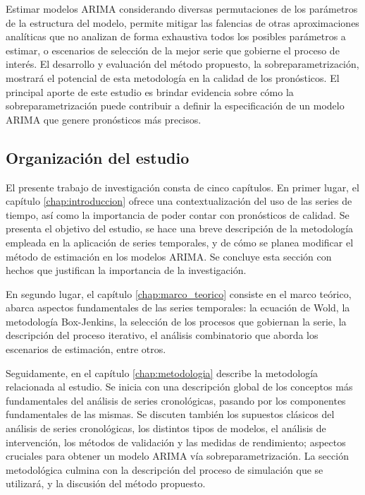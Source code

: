 \documentclass[
]{article}
\begin{document}
Estimar modelos ARIMA considerando diversas permutaciones de los
parámetros de la estructura del modelo, permite mitigar las falencias de
otras aproximaciones analíticas que no analizan de forma exhaustiva
todos los posibles parámetros a estimar, o escenarios de selección de la
mejor serie que gobierne el proceso de interés. El desarrollo y
evaluación del método propuesto, la sobreparametrización, mostrará el
potencial de esta metodología en la calidad de los pronósticos. El
principal aporte de este estudio es brindar evidencia sobre cómo la
sobreparametrización puede contribuir a definir la especificación de un
modelo ARIMA que genere pronósticos más precisos.

\subsection{Organización del estudio}

El presente trabajo de investigación consta de cinco capítulos. En
primer lugar, el capítulo \ref{chap:introduccion} ofrece una
contextualización del uso de las series de tiempo, así como la
importancia de poder contar con pronósticos de calidad. Se presenta el
objetivo del estudio, se hace una breve descripción de la metodología
empleada en la aplicación de series temporales, y de cómo se planea
modificar el método de estimación en los modelos ARIMA. Se concluye esta
sección con hechos que justifican la importancia de la investigación.

En segundo lugar, el capítulo \ref{chap:marco_teorico} consiste en el
marco teórico, abarca aspectos fundamentales de las series temporales:
la ecuación de Wold, la metodología Box-Jenkins, la selección de los
procesos que gobiernan la serie, la descripción del proceso iterativo,
el análisis combinatorio que aborda los escenarios de estimación, entre
otros.

Seguidamente, en el capítulo \ref{chap:metodologia} describe la
metodología relacionada al estudio. Se inicia con una descripción global
de los conceptos más fundamentales del análisis de series cronológicas,
pasando por los componentes fundamentales de las mismas. Se discuten
también los supuestos clásicos del análisis de series cronológicas, los
distintos tipos de modelos, el análisis de intervención, los métodos de
validación y las medidas de rendimiento; aspectos cruciales para obtener
un modelo ARIMA vía sobreparametrización. La sección metodológica
culmina con la descripción del proceso de simulación que se utilizará, y
la discusión del método propuesto.
\end{document}
